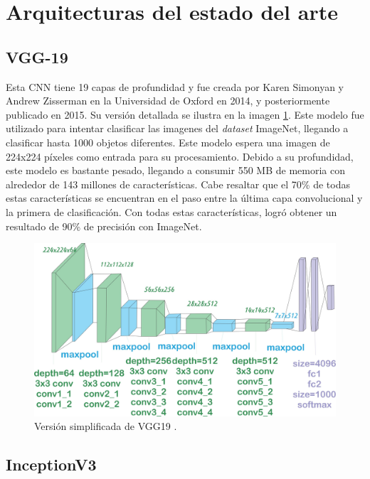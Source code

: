 \section{Arquitecturas del estado del arte}
\label{arquitecturas}

\subsection{VGG-19}
Esta CNN tiene 19 capas de profundidad y fue creada por Karen Simonyan y Andrew Zisserman 
\cite{Simonyan2015} en la Universidad de Oxford en 2014, y posteriormente publicado en 
2015. Su versión detallada se ilustra en la imagen \ref{VGG19}. Este modelo fue utilizado 
para intentar clasificar las imagenes del 
\textit{dataset} ImageNet, llegando a clasificar hasta 1000 objetos diferentes. 
Este modelo espera una imagen de 224x224 píxeles como entrada para su procesamiento. 
Debido a su profundidad, este modelo es bastante pesado, llegando a consumir 550 MB de 
memoria con alrededor de 143 millones de características. Cabe resaltar que el 70\% de 
todas estas características se encuentran en el paso entre la última capa convolucional y la 
primera de clasificación. Con todas estas características, logró obtener un resultado 
de 90\% de precisión con ImageNet.

\begin{figure}[h!]
\includegraphics[width=1\textwidth]{images/VGG19.jpeg}
\centering
\caption{Versión simplificada de VGG19 \cite{modelos}. }
\label{VGG19}
\end{figure}

\subsection{InceptionV3}
\label{sec:inceptionV3}

